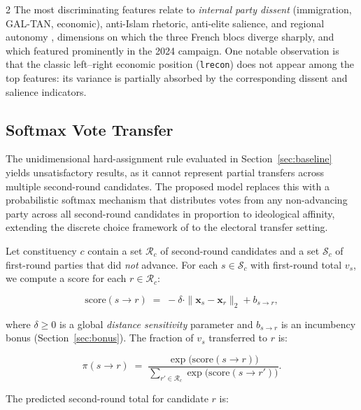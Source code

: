 \documentclass[10pt, a4paper]{article}
\begin{document}
\begin{multicols}{2}
\noindent
The most discriminating features relate to \emph{internal party dissent}
(immigration, GAL-TAN, economic), anti-Islam rhetoric, anti-elite salience,
and regional autonomy , dimensions on which the three French blocs diverge
sharply, and which featured prominently in the 2024 campaign.
One notable observation is that the classic left--right economic position
(\texttt{lrecon}) does not appear among the top features: its variance is
partially absorbed by the corresponding dissent and salience indicators.

\subsection{Softmax Vote Transfer}
\label{sec:softmax}

The unidimensional hard-assignment rule evaluated in
Section~\ref{sec:baseline} yields unsatisfactory results, as it cannot
represent partial transfers across multiple second-round candidates. The
proposed model replaces this with a probabilistic softmax mechanism that
distributes votes from any non-advancing party across all second-round
candidates in proportion to ideological affinity, extending the discrete
choice framework of \citet{mcfadden1974} to the electoral transfer setting.

Let constituency $c$ contain a set $\mathcal{R}_c$ of second-round candidates
and a set $\mathcal{S}_c$ of first-round parties that did \emph{not} advance.
For each $s \in \mathcal{S}_c$ with first-round total $v_s$, we compute a
score for each $r \in \mathcal{R}_c$:

\begin{equation}
  \label{eq:score}
  \mathrm{score}(s \to r) \;=\;
    -\delta \cdot \|\mathbf{x}_s - \mathbf{x}_r\|_2 + b_{s \to r},
\end{equation}

\noindent where $\delta \geq 0$ is a global \emph{distance sensitivity}
parameter and $b_{s\to r}$ is an incumbency bonus (Section~\ref{sec:bonus}).
The fraction of $v_s$ transferred to $r$ is:

\begin{equation}
  \label{eq:softmax}
  \pi(s \to r) \;=\;
    \frac{\exp\!\bigl(\mathrm{score}(s \to r)\bigr)}
         {\displaystyle\sum_{r' \in \mathcal{R}_c}
          \exp\!\bigl(\mathrm{score}(s \to r')\bigr)}.
\end{equation}

The predicted second-round total for candidate $r$ is:


\end{multicols}
\end{document}
